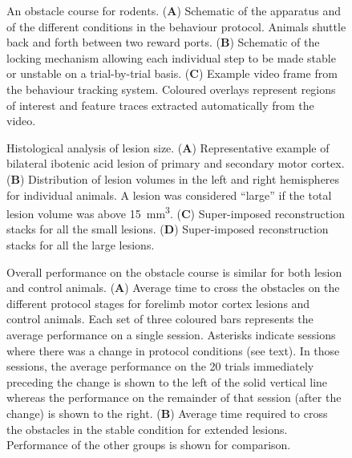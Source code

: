 
\begin{figure}
\centering

\caption{An obstacle course for rodents. (\textbf{A}) Schematic of the apparatus and of the different conditions in the behaviour protocol. Animals shuttle back and forth between two reward ports. (\textbf{B}) Schematic of the locking mechanism allowing each individual step to be made stable or unstable on a trial-by-trial basis. (\textbf{C}) Example video frame from the behaviour tracking system. Coloured overlays represent regions of interest and feature traces extracted automatically from the video. }
\label{fig:assay}
\end{figure}

\begin{figure}
\centering

\caption{Histological analysis of lesion size. (\textbf{A}) Representative example of bilateral ibotenic acid lesion of primary and secondary motor cortex. (\textbf{B}) Distribution of lesion volumes in the left and right hemispheres for individual animals. A lesion was considered ``large'' if the total lesion volume was above \SI{15}{\milli\meter\cubed}. (\textbf{C}) Super-imposed reconstruction stacks for all the small lesions. (\textbf{D}) Super-imposed reconstruction stacks for all the large lesions.}
\label{fig:histology}
\end{figure}

\begin{figure}
\centering

\caption{Overall performance on the obstacle course is similar for both lesion and control animals. (\textbf{A}) Average time to cross the obstacles on the different protocol stages for forelimb motor cortex lesions and control animals. Each set of three coloured bars represents the average performance on a single session. Asterisks indicate sessions where there was a change in protocol conditions (see text). In those sessions, the average performance on the 20 trials immediately preceding the change is shown to the left of the solid vertical line whereas the performance on the remainder of that session (after the change) is shown to the right. (\textbf{B}) Average time required to cross the obstacles in the stable condition for extended lesions. Performance of the other groups is shown for comparison.}
\label{fig:learning}
\end{figure}

